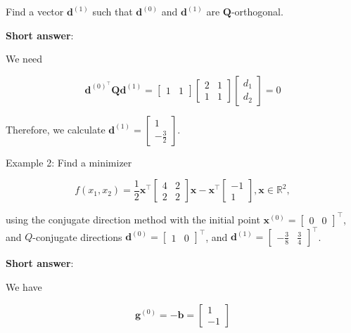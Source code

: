 Find a vector \(\boldsymbol{d}^{(1)}\) such that \(\boldsymbol{d}^{(0)}\) and \(\boldsymbol{d}^{(1)}\) are \(\boldsymbol{Q}\)-orthogonal.

\textbf{Short answer}:

We need

\[
	\boldsymbol{d}^{(0)^{\top}} \boldsymbol{Q} \boldsymbol{d}^{(1)}=\left[\begin{array}{ll}
		1 & 1
	\end{array}\right]\left[\begin{array}{ll}
		2 & 1 \\
		1 & 1
	\end{array}\right]\left[\begin{array}{l}
		d_{1} \\
		d_{2}
	\end{array}\right]=0
\]

Therefore, we calculate \(\boldsymbol{d}^{(1)}=\left[\begin{array}{c}1 \\ -\frac{3}{2}\end{array}\right]\).

Example 2: Find a minimizer

\[
	f\left(x_{1}, x_{2}\right)=\frac{1}{2} \boldsymbol{x}^{\top}\left[\begin{array}{ll}
		4 & 2 \\
		2 & 2
	\end{array}\right] \boldsymbol{x}-\boldsymbol{x}^{\top}\left[\begin{array}{c}
		-1 \\
		1
	\end{array}\right], \boldsymbol{x} \in \mathbb{R}^{2},
\]

using the conjugate direction method with the initial point \(\boldsymbol{x}^{(0)}=\left[\begin{array}{ll}0 & 0\end{array}\right]^{\top}\), and \(Q\)-conjugate directions \(\boldsymbol{d}^{(0)}=\left[\begin{array}{ll}1 & 0\end{array}\right]^{\top}\), and \(\boldsymbol{d}^{(1)}=\left[\begin{array}{ll}-\frac{3}{8} & \frac{3}{4}\end{array}\right]^{\top}\).

\textbf{Short answer}:

We have

\[
	\boldsymbol{g}^{(0)}=-\boldsymbol{b}=\left[\begin{array}{c}
		1 \\
		-1
	\end{array}\right]
\]

